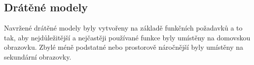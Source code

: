 



\subsection{Drátěné modely} \label{navrhWireframes}


Navržené drátěné modely byly vytvořeny na základě funkčních požadavků a to tak, aby nejdůležitější a nejčastěji používané funkce byly 
umístěny na domovskou obrazovku. Zbylé méně podstatné nebo prostorově náročnější byly umístěny na sekundární obrazovky.



